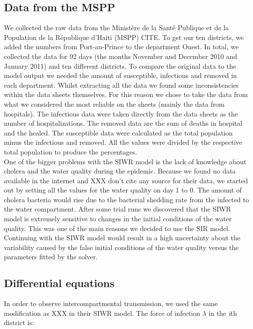 \documentclass[11pt]{article}
\begin{document}
\subsection{Data from the MSPP}
We collected the raw data from the Minist\`{e}re de la Sant\'{e} Publique et de la Population de la R\'{e}publique d'Haiti (MSPP) CITE. To get our ten districts, we added the numbers from Port-au-Prince to the department Ouest. In total, we collected the data for 92 days (the months November and December 2010 and January 2011) and ten different districts. To compare the original data to the model output we needed the amount of susceptible, infectious and removed in each department. Whilst extracting all the data we found some inconsistencies within the data sheets themselves. For this reason we chose to take the data from what we considered the most reliable on the sheets (mainly the data from hospitals). The infectious data were taken directly from the data sheets as the number of hospitalizations. The removed data are the sum of deaths in hospital and the healed. The susceptible data were calculated as the total population minus the infectious and removed. All the values were divided by the respective total population to produce the percentages.\\
One of the bigger problems with the SIWR model is the lack of knowledge about cholera and the water quality during the epidemic. Because we found no data available in the internet and XXX don't cite any source for their data, we started out by setting all the values for the water quality on day 1 to 0. The amount of cholera bacteria would rise due to the bacterial shedding rate from the infected to the water compartment. After some trial runs we discovered that the SIWR model is extremely sensitive to changes in the initial conditions of the water quality. This was one of the main reasons we decided to use the SIR model. Continuing with the SIWR model would result in a high uncertainty about the variability caused by the false initial conditions of the water quality versus the parameters fitted by the solver.






\subsection{Differential equations}
In order to observe intercompartmental transmission, we used the same modification as XXX in their SIWR model. The force of infection $\lambda$ in the \textit{i}th district is:
\end{document}
